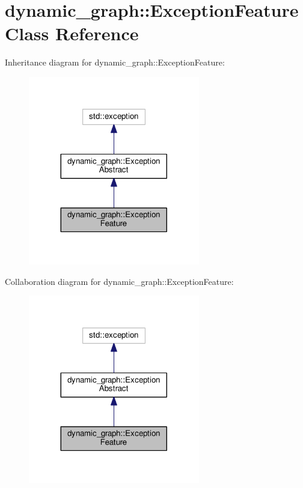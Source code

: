 \hypertarget{classdynamic__graph_1_1ExceptionFeature}{}\section{dynamic\+\_\+graph\+:\+:Exception\+Feature Class Reference}
\label{classdynamic__graph_1_1ExceptionFeature}


Inheritance diagram for dynamic\+\_\+graph\+:\+:Exception\+Feature\+:\nopagebreak
\begin{figure}[H]
\begin{center}
\leavevmode
\includegraphics[width=212pt]{classdynamic__graph_1_1ExceptionFeature__inherit__graph}
\end{center}
\end{figure}


Collaboration diagram for dynamic\+\_\+graph\+:\+:Exception\+Feature\+:\nopagebreak
\begin{figure}[H]
\begin{center}
\leavevmode
\includegraphics[width=212pt]{classdynamic__graph_1_1ExceptionFeature__coll__graph}
\end{center}
\end{figure}
